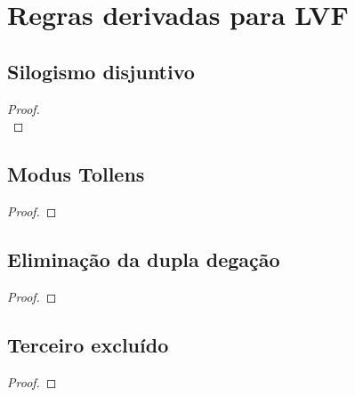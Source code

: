 \newpage
\section{Regras derivadas para LVF}
\begin{multicols}{2}
\subsection*{Silogismo disjuntivo}
\begin{proof}

\\	
\end{proof}

\subsection*{Modus Tollens}

\begin{proof}
	 
\end{proof}

\subsection*{Eliminação da dupla degação}
	\begin{proof}
	\end{proof}


\subsection*{Terceiro excluído}
	\begin{proof}
		\open
		\close
		\open
		\close
	\end{proof}

%
%


\end{multicols}

